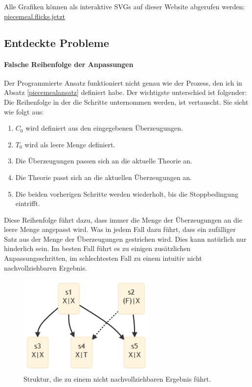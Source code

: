 \documentclass{article}
\begin{document}
Alle Grafiken können als interaktive SVGs auf dieser Website abgerufen werden: \href{https://piecemeal.flicks.jetzt/}{piecemeal.flicks.jetzt}

\subsection{Entdeckte Probleme}
\paragraph{Falsche Reihenfolge der Anpassungen} Der Programmierte Ansatz funktioniert nicht genau wie der Prozess, den ich in Absatz \ref{piecemealansatz} definiert habe. Der wichtigste unterschied ist folgender: Die Reihenfolge in der die Schritte unternommen werden, ist vertauscht. Sie sieht wie folgt aus:
\begin{enumerate}
    \item $C_0$ wird definiert aus den eingegebenen Überzeugungen.
    \item $T_0$ wird als leere Menge definiert.
    \item Die Überzeugungen passen sich an die aktuelle Theorie an.
    \item Die Theorie passt sich an die aktuellen Überzeugungen an.
    \item Die beiden vorherigen Schritte werden wiederholt, bis die Stoppbedingung eintrifft.
\end{enumerate}

Diese Reihenfolge führt dazu, dass immer die Menge der Überzeugungen an die leere Menge angepasst wird. Was in jedem Fall dazu führt, dass ein zufälliger Satz aus der Menge der Überzeugungen gestrichen wird. Dies kann natürlich nur hinderlich sein. Im besten Fall führt es zu einigen zusätzlichen Anpassungsschritten, im schlechtesten Fall zu einem intuitiv nicht nachvollziehbaren Ergebnis.

\begin{figure}[ht]
  \centering
  \includegraphics[width=\textwidth,height=5cm,keepaspectratio]{images/wierd.png}
  \caption{Struktur, die zu einem nicht nachvollziehbaren Ergebnis führt.\label{fig:wierd}}
\end{figure}
\end{document}
